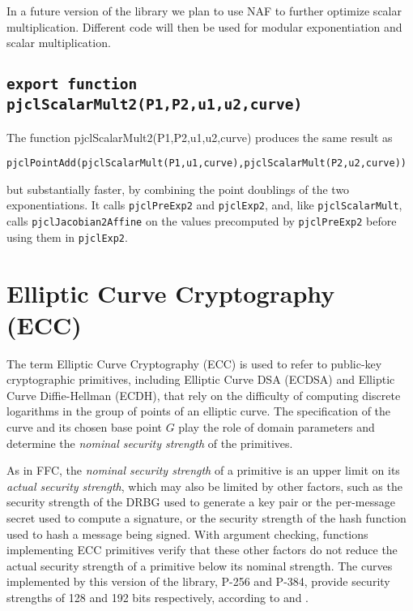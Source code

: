 \documentclass[12pt]{article}
\begin{document}
In a future version of the library we plan to use NAF to further optimize scalar multiplication.
Different code will then be used for modular exponentiation and scalar multiplication.

\subsection{\tt export function pjclScalarMult2(P1,P2,u1,u2,curve)}

The function pjclScalarMult2(P1,P2,u1,u2,curve) produces the
same result as
\begin{verbatim}
pjclPointAdd(pjclScalarMult(P1,u1,curve),pjclScalarMult(P2,u2,curve))
\end{verbatim}
but substantially faster, by combining the point doublings of the two
exponentiations.  It calls {\tt pjclPreExp2} and {\tt pjclExp2}, and,
like {\tt pjclScalarMult}, calls {\tt pjclJacobian2Affine} on the values precomputed
by {\tt pjclPreExp2} before using them in {\tt pjclExp2}. 

\section{Elliptic Curve Cryptography (ECC)}

The term Elliptic Curve Cryptography (ECC) is used to refer to public-key cryptographic
primitives, including Elliptic Curve DSA (ECDSA) and Elliptic Curve Diffie-Hellman (ECDH), 
that rely on the difficulty of computing discrete logarithms in the group of points of an
elliptic curve.  The specification of the curve and its chosen base point $G$ play the role 
of domain parameters and determine the {\em nominal security strength\/} of the primitives.

As in FFC, the {\em nominal security strength\/} of a primitive is 
an upper limit on its {\em actual security strength}, which may also be limited by other factors,
such as the security strength of the DRBG used to generate a key pair or the per-message secret
used to compute a signature, or the security strength of the hash function used to hash 
a message being signed.  With argument checking, functions implementing ECC primitives
verify that these other factors do not reduce the actual security
strength of a primitive below its nominal strength.  The curves implemented by this
version of the library, P-256 and P-384, provide security strengths of 128 and 192 bits
respectively, according to \cite[Table~2]{sp800-57part1rev4} and \cite[Table~2]{NIST-DH}.
\end{document}
